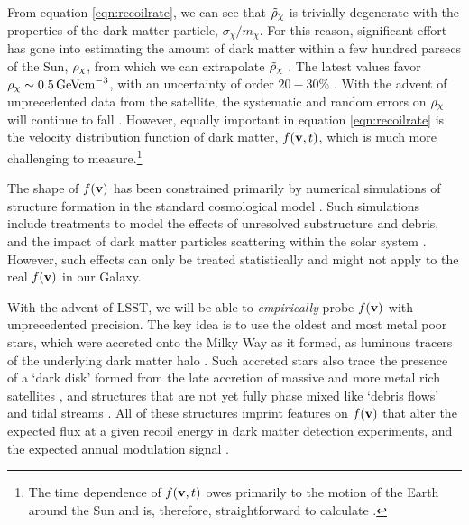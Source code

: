 From equation \ref{eqn:recoilrate}, we can see that $\tilde{\rho}_\mathrm{\chi}$ is trivially degenerate with the properties of the dark matter particle, $\sigma_\chi/m_\chi$. For this reason, significant effort has gone into estimating the amount of dark matter within a few hundred parsecs of the Sun, $\rho_\mathrm{\chi}$, from which we can extrapolate $\tilde{\rho}_\mathrm{\chi}$ \citep[see][for a review]{2014JPhG...41f3101R}. The latest values favor $\rho_\mathrm{\chi} \sim 0.5\,{\rm GeV cm}^{-3}$, with an uncertainty of order $20-30$\% \citep[\eg,][]{2014A&A...571A..92B,2018MNRAS.478.1677S}. With the advent of unprecedented data from the \Gaia satellite, the systematic and random errors on $\rho_\mathrm{\chi}$ will continue to fall \citep{2014JPhG...41f3101R}. However, equally important in equation \ref{eqn:recoilrate} is the velocity distribution function of dark matter, $f({\bf v},t)$, which is much more challenging to measure.\footnote{The time dependence of $f({\bf v},t)$ owes primarily to the motion of the Earth around the Sun and is, therefore, straightforward to calculate \citep[\eg,][]{1986PhRvD..33.3495D}.}

The shape of $f({\bf v})$ has been constrained primarily by numerical simulations of structure formation in the standard cosmological model \citep[\eg,][]{2009MNRAS.395..797V,1210.2721}. Such simulations include treatments to model the effects of unresolved substructure and debris, and the impact of dark matter particles scattering within the solar system \citep[\eg,][]{2009PhRvD..79j3531P}. However, such effects can only be treated statistically and might not apply to the real $f({\bf v})$ in our Galaxy.

With the advent of LSST, we will be able to {\it empirically} probe $f({\bf v})$ with unprecedented precision. The key idea is to use the oldest and most metal poor stars, which were accreted onto the Milky Way as it formed, as luminous tracers of the underlying dark matter halo \citep{Lisanti:2011as,Kuhlen:2012fz,2014MNRAS.445L..21T,Lisanti:2014dva,2018PhRvL.120d1102H,Necib:2018b}. Such accreted stars also trace the presence of a `dark disk' formed from the late accretion of massive and more metal rich satellites \citep{1989AJ.....98.1554L,2008MNRAS.389.1041R,2009MNRAS.397...44R,2014MNRAS.444..515R,2015MNRAS.450.2874R}, and structures that are not yet fully phase mixed like `debris flows' \citep[\eg,][]{Lisanti:2011as,2018MNRAS.477.1472B,2018Natur.563...85H,necib2018} and tidal streams \citep[\eg,][]{2005PhRvD..71d3516F,1807.09004}. All of these structures imprint features on $f({\bf v})$ that alter the expected flux at a given recoil energy in dark matter detection experiments, and the expected annual modulation signal \citep[\eg,][]{2005PhRvD..71d3516F,2009ApJ...696..920B,2018arXiv181011468E}.

